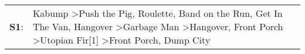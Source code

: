 \begin{supertabular}{p{0.03\textwidth}p{0.92\textwidth}}
 \textbf{S1}:  &  Kabump\textsuperscript{} \textgreater \enspace Push the Pig\textsuperscript{}, \enspace Roulette\textsuperscript{}, \enspace Band on the Run\textsuperscript{}, \enspace Get In The Van\textsuperscript{}, \enspace Hangover\textsuperscript{} \textgreater \enspace Garbage Man\textsuperscript{} \textgreater \enspace Hangover\textsuperscript{}, \enspace Front Porch\textsuperscript{} \textgreater \enspace Utopian Fir[1]\textsuperscript{} \textgreater \enspace Front Porch\textsuperscript{}, \enspace Dump City\textsuperscript{}  \enspace  \\
\end{supertabular}
